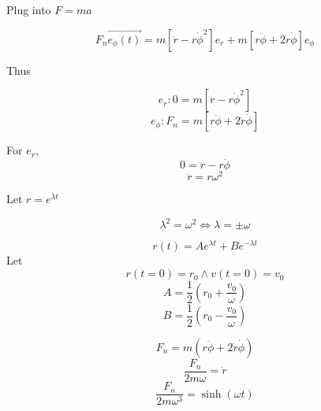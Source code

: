 \documentclass{article}
\newtheorem{one minute paper}[theorem]{One Minute Paper}
\begin{document}
Plug into $F = ma$

\begin{equation}
    F_n\vec{e_\phi(t)} = m\left[\ddot{r} - r\dot{\phi}^2\right]e_r + m\left[r\ddot{\phi} + 2\dot{r}\dot{\phi}\right]e_\phi
\end{equation}

Thus

\begin{equation}
    e_r : 0 =  m\left[\ddot{r} - r\dot{\phi}^2\right]
\end{equation}
\begin{equation}
    e_\phi: F_n = m\left[r\ddot{\phi} + 2\dot{r}\dot{\phi}\right]
\end{equation}

For $e_r$, 
\begin{equation}
    0 = \ddot{r} - r\ddot{\phi}
\end{equation}
\begin{equation}
    \ddot{r} = r\omega^2
\end{equation}

Let $r = e^{\lambda t}$

\begin{equation}
    \lambda^2 = \omega^2 \iff \lambda = \pm \omega
\end{equation}

\begin{equation}
    r(t) = Ae^{\lambda t} + Be^{-\lambda t}
\end{equation}
Let \begin{equation}
    r(t = 0) = r_0 \land v(t = 0) = v_0
\end{equation}
\begin{equation}
    A = \frac{1}{2}(r_0 + \frac{v_0}{\omega})
\end{equation}
\begin{equation}
    B = \frac{1}{2}(r_0 - \frac{v_0}{\omega})
\end{equation}

\begin{center}
\end{center}

\begin{equation}
    F_n = m(r\ddot{\phi} + 2\dot{r}\dot{\phi})
\end{equation}
\begin{equation}
    \frac{F_n}{2m\omega} = \dot{r}  
\end{equation}
\begin{equation}
    \frac{F_n}{2m\omega^3} = \sinh(\omega t)
\end{equation}
\end{document}

